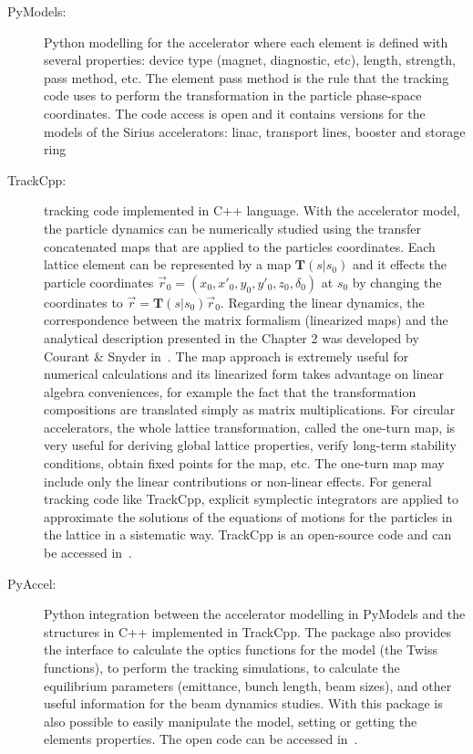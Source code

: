 \begin{description}
    \item[PyModels:] Python modelling for the accelerator where each element is defined with several properties: device type (magnet, diagnostic, etc), length, strength, pass method, etc. The element pass method is the rule that the tracking code uses to perform the transformation in the particle phase-space coordinates. The code access is open and it contains versions for the models of the Sirius accelerators: \gls{linac}, transport lines, booster and storage ring~\cite{pymodels}
    \item[TrackCpp:] tracking code implemented in C++ language. With the accelerator model, the particle dynamics can be numerically studied using the transfer concatenated maps that are applied to the particles coordinates. Each lattice element can be represented by a map $\mathbf{T}(s|s_0)$ and it effects the particle coordinates $\vec{r}_0 = \left(x_0, x'_0, y_0, y'_0, z_0, \delta_0\right)$ at $s_0$ by changing the coordinates to $\vec{r} = \mathbf{T}(s|s_0)\vec{r}_0$. Regarding the linear dynamics, the correspondence between the matrix formalism (linearized maps) and the analytical description presented in the Chapter 2 was developed by Courant \& Snyder in~\cite{CourantSnyder1958}. The map approach is extremely useful for numerical calculations and its linearized form takes advantage on linear algebra conveniences, for example the fact that the transformation compositions are translated simply as matrix multiplications. For circular accelerators, the whole lattice transformation, called the one-turn map, is very useful for deriving global lattice properties, verify long-term stability conditions, obtain fixed points for the map, etc. The one-turn map may include only the linear contributions or non-linear effects. For general tracking code like TrackCpp, explicit symplectic integrators are applied to approximate the solutions of the equations of motions for the particles in the lattice in a sistematic way. TrackCpp is an open-source code and can be accessed in~\cite{trackcpp}.
    \item[PyAccel:] Python integration between the accelerator modelling in PyModels and the structures in C++ implemented in TrackCpp. The package also provides the interface to calculate the optics functions for the model (the Twiss functions), to perform the tracking simulations, to calculate the equilibrium parameters (emittance, bunch length, beam sizes), and other useful information for the beam dynamics studies. With this package is also possible to easily manipulate the model, setting or getting the elements properties. The open code can be accessed in~\cite{pyaccel}.
\end{description}

